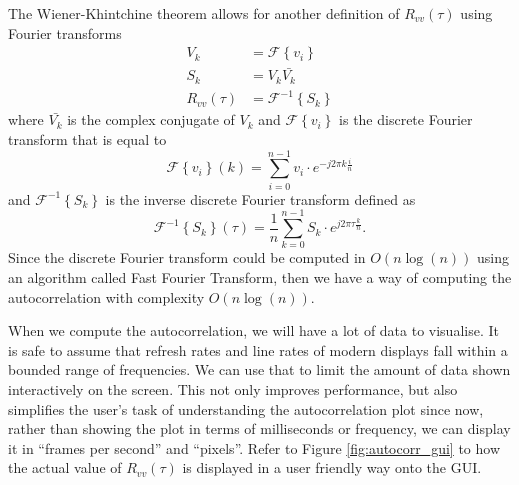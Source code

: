 \documentclass[a4paper,12pt,twoside,openright]{report}
\begin{document}
The Wiener-Khintchine theorem \cite{wiener1964} allows for another definition of $R_{vv}(\tau)$ using Fourier transforms
\begin{equation}
	\begin{aligned}
	V_{k} & = \mathcal{F} \left\{ v_{i} \right\} \\
	S_{k} & = V_{k} \bar{V_{k}} \\
	R_{vv}(\tau) & = \mathcal{F}^{-1} \left\{ S_{k} \right\}
	\end{aligned}
\end{equation}
where $\bar{V_{k}}$ is the complex conjugate of $V_{k}$ and $\mathcal{F} \left\{ v_{i} \right\}$ is the discrete Fourier transform that is equal to
$$\mathcal{F} \left\{ v_{i} \right\} (k) = \sum_{i = 0}^{n-1} v_{i} \cdot e^{- j 2 \pi k \frac{i}{n}} $$
and $\mathcal{F}^{-1} \left\{ S_{k} \right\}$ is the inverse discrete Fourier transform defined as
$$\mathcal{F}^{-1} \left\{ S_{k} \right\} (\tau) = \frac{1}{n} \sum_{k = 0}^{n-1} S_{k} \cdot e^{j 2 \pi \tau \frac{k}{n}}. $$
Since the discrete Fourier transform could be computed in $O(n \log(n))$ using an algorithm called Fast Fourier Transform, then we have a way of computing the autocorrelation with complexity $O(n \log(n))$.

When we compute the autocorrelation, we will have a lot of data to visualise. It is safe to assume that refresh rates and line rates of modern displays fall within a bounded range of frequencies. We can use that to limit the amount of data shown interactively on the screen. This not only improves performance, but also simplifies the user's task of understanding the autocorrelation plot since now, rather than showing the plot in terms of milliseconds or frequency, we can display it in ``frames per second'' and ``pixels''. Refer to Figure \ref{fig:autocorr_gui} to how the actual value of $R_{vv}(\tau)$ is displayed in a user friendly way onto the GUI.
\end{document}
